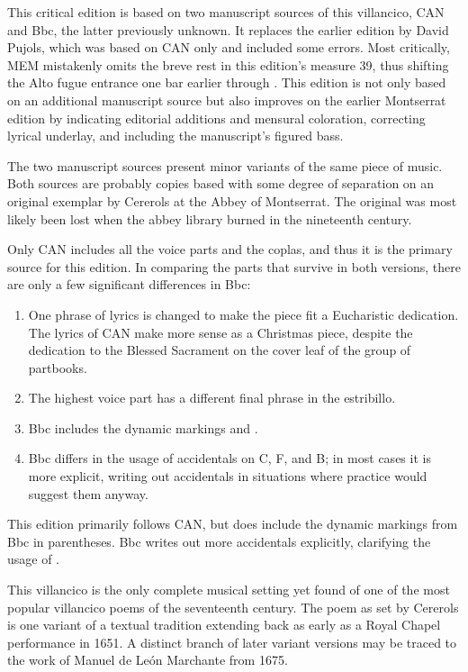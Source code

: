 This critical edition is based on two manuscript sources of this villancico, 
CAN and Bbc, the latter previously unknown.
It replaces the earlier edition by David Pujols, which was based on CAN only 
and included some errors.
Most critically, MEM mistakenly omits the breve rest in this edition's measure 
39, thus shifting the Alto fugue entrance one bar earlier through .
This edition is not only based on an additional manuscript source but also 
improves on the earlier Montserrat edition by indicating editorial additions 
and mensural coloration, correcting lyrical underlay, and including the 
manuscript's figured bass.

The two manuscript sources present minor variants of the same piece of music.
Both sources are probably copies based with some degree of separation on an 
original exemplar by Cererols at the Abbey of Montserrat.
The original was most likely been lost when the abbey library burned in the 
nineteenth century.

Only CAN includes all the voice parts and the coplas, and thus it is the 
primary source for this edition.%
  \autocite[60--61]{Bonastre:CanetCatalog}
In comparing the parts that survive in both versions, there are only a few 
significant differences in Bbc: 
\begin{enumerate}
    \item One phrase of lyrics is changed to make the piece fit a Eucharistic
        dedication.  
        The lyrics of CAN make more sense as a Christmas piece, despite the
        dedication to the Blessed Sacrament on the cover leaf of the group of
        partbooks.
    \item The highest voice part has a different final phrase in the estribillo.
    \item Bbc includes the dynamic markings  and .
    \item Bbc differs in the usage of accidentals on C, F, and B; in most cases
        it is more explicit, writing out accidentals in situations where
         practice would suggest them anyway.
\end{enumerate}
This edition primarily follows CAN, but does include the dynamic markings from 
Bbc in parentheses.
Bbc writes out more accidentals explicitly, clarifying the usage of .



This villancico is the only complete musical setting yet found of one of the 
most popular villancico poems of the seventeenth century.
The poem as set by Cererols is one variant of a textual tradition extending 
back as early as a Royal Chapel performance in 1651.
A distinct branch of later variant versions may be traced to the work of Manuel 
de León Marchante from 1675.

